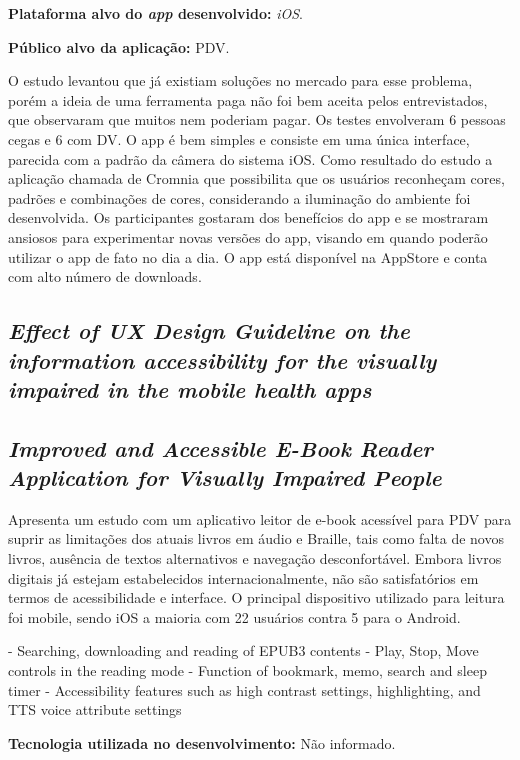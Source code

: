 \textbf{Plataforma alvo do \emph{app} desenvolvido:} \emph{iOS}.

\textbf{Público alvo da aplicação:} PDV\@.

O estudo levantou que já existiam soluções no mercado para esse problema, porém a ideia de uma ferramenta paga não foi bem aceita pelos entrevistados, que observaram que muitos nem poderiam pagar.
Os testes envolveram 6 pessoas cegas e 6 com DV\@.
O app é bem simples e consiste em uma única interface, parecida com a padrão da câmera do sistema iOS.
Como resultado do estudo a aplicação chamada de Cromnia que possibilita que os usuários reconheçam cores, padrões e combinações de cores, considerando a iluminação do ambiente foi desenvolvida.
Os participantes gostaram dos benefícios do app e se mostraram ansiosos para experimentar novas versões do app, visando em quando poderão utilizar o app de fato no dia a dia.
O app está disponível na AppStore e conta com alto número de downloads.

\subsection{\emph{Effect of UX Design Guideline on the information accessibility for the visually impaired in the mobile health apps}}

\lipsum[31]

\subsection{\emph{Improved and Accessible E-Book Reader Application for Visually Impaired People}}

Apresenta um estudo com um aplicativo leitor de e-book acessível para PDV para suprir as limitações dos atuais livros em áudio e Braille, tais como falta de novos livros, ausência de textos alternativos e navegação desconfortável.
Embora livros digitais já estejam estabelecidos internacionalmente, não são satisfatórios em termos de acessibilidade e interface.
O principal dispositivo utilizado para leitura foi mobile, sendo iOS a maioria com 22 usuários contra 5 para o Android.

- Searching, downloading and reading of EPUB3 contents
- Play, Stop, Move controls in the reading mode
- Function of bookmark, memo, search and sleep timer
- Accessibility features such as high contrast settings, highlighting, and TTS voice attribute settings

\textbf{Tecnologia utilizada no desenvolvimento:} Não informado.


